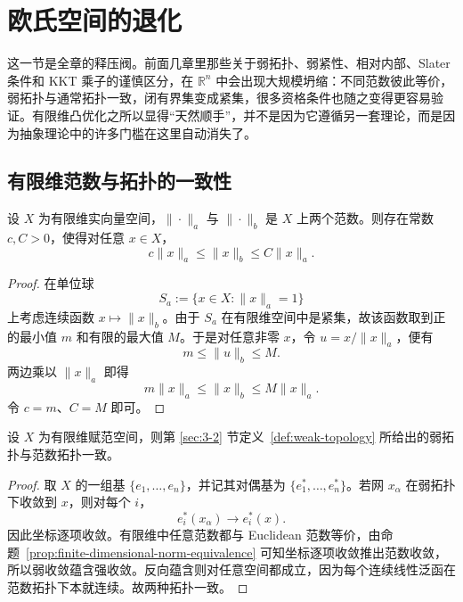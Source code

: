 \section{欧氏空间的退化}

\label{sec:8-1}

这一节是全章的释压阀。前面几章里那些关于弱拓扑、弱紧性、相对内部、Slater 条件和 KKT 乘子的谨慎区分，在 $\mathbb R^n$ 中会出现大规模坍缩：不同范数彼此等价，弱拓扑与通常拓扑一致，闭有界集变成紧集，很多资格条件也随之变得更容易验证。有限维凸优化之所以显得“天然顺手”，并不是因为它遵循另一套理论，而是因为抽象理论中的许多门槛在这里自动消失了。

\subsection{有限维范数与拓扑的一致性}

\begin{proposition}[有限维中的范数等价]\label{prop:finite-dimensional-norm-equivalence}
设 $X$ 为有限维实向量空间，$\|\cdot\|_a$ 与 $\|\cdot\|_b$ 是 $X$ 上两个范数。则存在常数 $c,C>0$，使得对任意 $x\in X$，
\[
c\|x\|_a\le \|x\|_b\le C\|x\|_a.
\]
\end{proposition}

\begin{proof}
在单位球
\[
S_a:=\{x\in X:\|x\|_a=1\}
\]
上考虑连续函数 $x\mapsto \|x\|_b$。由于 $S_a$ 在有限维空间中是紧集，故该函数取到正的最小值 $m$ 和有限的最大值 $M$。于是对任意非零 $x$，令 $u=x/\|x\|_a$，便有
\[
m\le \|u\|_b\le M.
\]
两边乘以 $\|x\|_a$ 即得
\[
m\|x\|_a\le \|x\|_b\le M\|x\|_a.
\]
令 $c=m$、$C=M$ 即可。
\end{proof}

\begin{proposition}[有限维中弱拓扑与强拓扑一致]\label{prop:finite-dimensional-weak-strong-equivalence}
设 $X$ 为有限维赋范空间，则第 \ref{sec:3-2} 节定义~\ref{def:weak-topology} 所给出的弱拓扑与范数拓扑一致。
\end{proposition}

\begin{proof}
取 $X$ 的一组基 $\{e_1,\dots,e_n\}$，并记其对偶基为 $\{e_1^\ast,\dots,e_n^\ast\}$。若网 $x_\alpha$ 在弱拓扑下收敛到 $x$，则对每个 $i$，
\[
e_i^\ast(x_\alpha)\to e_i^\ast(x).
\]
因此坐标逐项收敛。有限维中任意范数都与 Euclidean 范数等价，由命题~\ref{prop:finite-dimensional-norm-equivalence} 可知坐标逐项收敛推出范数收敛，所以弱收敛蕴含强收敛。反向蕴含则对任意空间都成立，因为每个连续线性泛函在范数拓扑下本就连续。故两种拓扑一致。
\end{proof}

